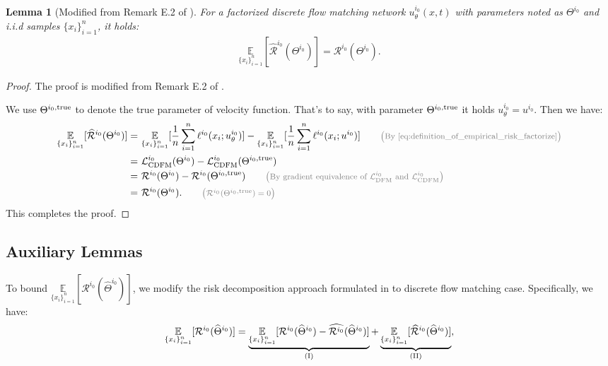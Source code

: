 \documentclass[12pt]{article}
\numberwithin{equation}{section}
\let\hat\widehat
\newcommand{\wh}{\widehat}
\renewcommand{\hat}{\wh}
\DeclareMathOperator*{\E}{{\mathbb{E}}}
\def\E{\mathbb{E}}
\let\cite\citep
\theoremstyle{theoremstyle}
\newtheorem{lemma}{Lemma}[section]
\numberwithin{equation}{section}
\numberwithin{theorem}{section}
\numberwithin{proposition}{section}
\numberwithin{definition}{section}
\numberwithin{lemma}{section}
\numberwithin{assumption}{section}
\numberwithin{remark}{section}
\newcommand*{\annot}[1]{\tag*{\footnotesize{\textcolor{black!50}{\big(#1\big)}}}}
\begin{document}
\begin{lemma}[Modified from Remark E.2 of \cite{su2025high}]
\label{lem:expectation_of_empirical_risk_equal_to_risk_factorize}
For a factorized discrete flow matching network $u^{i_0}_\theta(x,t)$ with parameters noted as $\Theta^{i_0}$ and i.i.d samples $\{x_i\}_{i=1}^n$, it holds:
\begin{align*}
    \underset{\{x_i\}_{i=1}^n}{\E}[\hat{\mathcal{R}}^{i_0}(\Theta^{i_0})]=\mathcal{R}^{i_0}(\Theta^{i_0}).
\end{align*}
\end{lemma}

\begin{proof}
The proof is modified from Remark E.2 of \cite{su2025high}.

We use $\Theta^{i_0,\rm true}$ to denote the true parameter of velocity function. 
That's to say, with parameter $\Theta^{i_0, \rm true}$ it holds $u^{i_0}_\theta=u^{i_0}$.
Then we have:
\begin{align*}
    \underset{\{x_i\}_{i=1}^n}{\E}[\hat{\mathcal{R}}^{i_0}(\Theta^{i_0})]= & ~
    \underset{\{x_i\}_{i=1}^n}{\E}[\frac{1}{n}\sum_{i=1}^n\ell^{i_0}(x_i;u^{i_0}_\theta)]-\underset{\{x_i\}_{i=1}^n}{\E}[\frac{1}{n}\sum_{i=1}^n\ell^{i_0}(x_i;u^{i_0})] \annot{By \eqref{eq:definition_of_empirical_risk_factorize}}\\
    = & ~
    \mathcal{L}^{i_0}_{\rm CDFM}(\Theta^{i_0})-\mathcal{L}^{i_0}_{\rm CDFM}(\Theta^{i_0, \rm true}) \\
    = & ~
    \mathcal{R}^{i_0}(\Theta^{i_0})-\mathcal{R}^{i_0}(\Theta^{i_0, \rm true}) \annot{By gradient equivalence of $\mathcal{L}^{i_0}_{\rm DFM}$ and $\mathcal{L}^{i_0}_{\rm CDFM}$} \\
    = & ~
    \mathcal{R}^{i_0}(\Theta^{i_0}). \annot{$\mathcal{R}^{i_0}(\Theta^{i_0, \rm true})=0$}
\end{align*}
This completes the proof.
\end{proof}

\subsection{Auxiliary Lemmas}
\label{sec:aux_velocity_esti_extension_factorize}
To bound $\underset{\{x_i\}_{i=1}^n}{\E}[\mathcal{R}^{i_0}(\hat{\Theta}^{i_0})]$, we modify the risk decomposition approach formulated in  \cite{fu2024unveil} to discrete flow matching case.
Specifically, we have:
\begin{align}\label{eq:risk_decomposition_factorize}
    \underset{\{x_i\}_{i=1}^n}{\E}[\mathcal{R}^{i_0}(\hat{\Theta}^{i_0})]=\underbrace{\underset{\{x_i\}_{i=1}^n}{\E}[\mathcal{R}^{i_0}(\hat{\Theta}^{i_0})-\hat{\mathcal{R}^{i_0}}(\hat{\Theta}^{i_0})]}_{\rm (I)}+\underbrace{\underset{\{x_i\}_{i=1}^n}{\E}[\hat{\mathcal{R}}^{i_0}(\hat{\Theta}^{i_0})]}_{\rm (II)},
\end{align}
\end{document}
